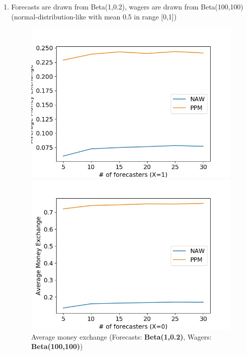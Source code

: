 \documentclass[english,10pt]{article}
\begin{document}
\begin{enumerate}
	
	
	\item Forecasts are drawn from Beta(1,0.2), wagers are drawn from Beta(100,100) (normal-distribution-like with mean 0.5 in range [0,1])

	\begin{figure}[H]
        	\centering
        	\begin{minipage}{0.48\textwidth}
        	\includegraphics[width = \textwidth]{(Beta(1_0dot2)F_Beta(100_100)W)Avg_MnEx(X=1).jpg}
        	\end{minipage}
        	\begin{minipage}{0.48\textwidth}
        	\includegraphics[width = \textwidth]{(Beta(1_0dot2)F_Beta(100_100)W)Avg_MnEx(X=0).jpg}
        	\end{minipage}
        	\caption{Average money exchange (Forecasts: \textbf{Beta(1,0.2)}, Wagers: \textbf{Beta(100,100)})}
        	\end{figure}
	

\end{enumerate}
\end{document}
